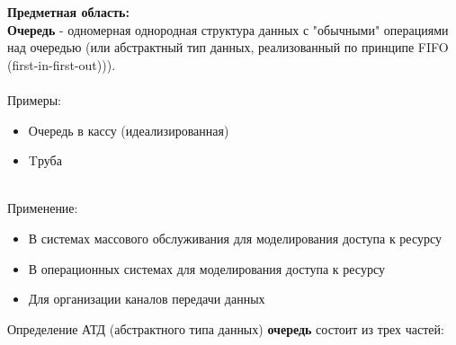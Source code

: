   \textbf{Предметная область:} \\
  \textbf{Очередь} - одномерная однородная структура данных с "обычными" операциями над очередью (или абстрактный тип данных, реализованный по принципе  FIFO (first-in-first-out))). \\ \\
  
  Примеры:\\

  \begin{itemize}
    \item Очередь в кассу (идеализированная) 
    \item Tруба
  \end{itemize} \\

  Применение:\\

  \begin{itemize}
    \item В системах массового обслуживания для моделирования доступа к ресурсу
    \item В операционных системах для моделирования доступа к ресурсу
    \item Для организации каналов передачи данных
  \end{itemize}

  Определение АТД (абстрактного типа данных) \textbf{очередь} состоит из трех частей:\\

